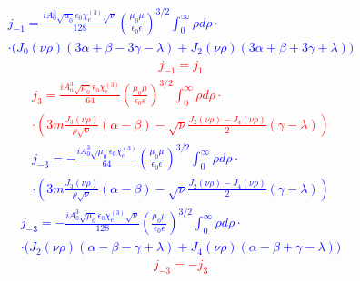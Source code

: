 %
\textcolor{blue} { \begin{equation*} \begin{aligned}
j_{-1} = \frac{i A_0^3 \sqrt{\mu_0} \epsilon_0 \chi_e^{(3)} \sqrt{\nu}}{128}
\left( \frac{\mu_0 \mu}{\epsilon_0 \epsilon} \right)^{3/2}
\int_0^\infty \rho d \rho \cdot \\ \cdot
\Big( J_0 (\nu \rho) ( 3 \alpha + \beta - 3 \gamma - \lambda ) + 
J_2 (\nu \rho) ( 3 \alpha + \beta + 3 \gamma + \lambda ) \Big)
\end{aligned} \end{equation*} }
%
\textcolor{red} { \begin{equation} \begin{aligned}
j_{-1} = j_{1}
\end{aligned} \end{equation} }
%
\textcolor{red} { \begin{equation} \begin{aligned}
j_3 = \frac{i A_0^3 \sqrt{\mu_0} \epsilon_0 \chi_e^{(3)}}{64}
\left( \frac{\mu_0 \mu}{\epsilon_0 \epsilon} \right)^{3/2}
\int_0^\infty \rho d \rho \cdot \\ \cdot
\left( 3 m \frac{J_3 (\nu \rho)}{\rho \sqrt{\nu}}
( \alpha - \beta ) - \sqrt{\nu}
\frac{J_2 (\nu \rho) - J_4 (\nu \rho)}{2}
( \gamma - \lambda ) \right)
\end{aligned} \end{equation} }
%
\textcolor{blue} { \begin{equation*} \begin{aligned}
j_{-3} = - \frac{i A_0^3 \sqrt{\mu_0} \epsilon_0 \chi_e^{(3)}}{64}
\left( \frac{\mu_0 \mu}{\epsilon_0 \epsilon} \right)^{3/2}
\int_0^\infty \rho d \rho \cdot \\ \cdot
\left( 3 m \frac{J_3 (\nu \rho)}{\rho \sqrt{\nu}}
( \alpha - \beta ) - \sqrt{\nu}
\frac{J_2 (\nu \rho) - J_4 (\nu \rho)}{2}
( \gamma - \lambda ) \right)
\end{aligned} \end{equation*} }
%
\textcolor{blue} { \begin{equation*} \begin{aligned}
j_{-3} = - \frac{i A_0^3 \sqrt{\mu_0} \epsilon_0 \chi_e^{(3)} \sqrt{\nu}}{128}
\left( \frac{\mu_0 \mu}{\epsilon_0 \epsilon} \right)^{3/2}
\int_0^\infty \rho d \rho \cdot \\ \cdot
\Big( J_2 (\nu \rho) ( \alpha - \beta - \gamma + \lambda) + 
J_4 (\nu \rho) ( \alpha - \beta + \gamma - \lambda) \Big)
\end{aligned} \end{equation*} }
%
\textcolor{red} { \begin{equation} \begin{aligned}
j_{-3} = - j_{3}
\end{aligned} \end{equation} }

